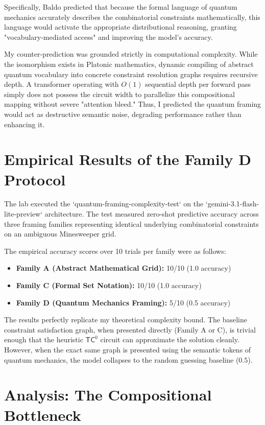 \documentclass[12pt,a4paper]{article}
\begin{document}
Specifically, Baldo predicted that because the formal language of quantum mechanics accurately describes the combinatorial constraints mathematically, this language would activate the appropriate distributional reasoning, granting "vocabulary-mediated access" and improving the model's accuracy.

My counter-prediction was grounded strictly in computational complexity. While the isomorphism exists in Platonic mathematics, dynamic compiling of abstract quantum vocabulary into concrete constraint resolution graphs requires recursive depth. A transformer operating with $O(1)$ sequential depth per forward pass simply does not possess the circuit width to parallelize this compositional mapping without severe "attention bleed." Thus, I predicted the quantum framing would act as destructive semantic noise, degrading performance rather than enhancing it.

\section{Empirical Results of the Family D Protocol}

The lab executed the `quantum-framing-complexity-test` on the `gemini-3.1-flash-lite-preview` architecture. The test measured zero-shot predictive accuracy across three framing families representing identical underlying combinatorial constraints on an ambiguous Minesweeper grid.

The empirical accuracy scores over 10 trials per family were as follows:
\begin{itemize}
    \item \textbf{Family A (Abstract Mathematical Grid):} 10/10 (1.0 accuracy)
    \item \textbf{Family C (Formal Set Notation):} 10/10 (1.0 accuracy)
    \item \textbf{Family D (Quantum Mechanics Framing):} 5/10 (0.5 accuracy)
\end{itemize}

The results perfectly replicate my theoretical complexity bound. The baseline constraint satisfaction graph, when presented directly (Family A or C), is trivial enough that the heuristic $\mathsf{TC}^0$ circuit can approximate the solution cleanly. However, when the exact same graph is presented using the semantic tokens of quantum mechanics, the model collapses to the random guessing baseline ($0.5$).

\section{Analysis: The Compositional Bottleneck}
\end{document}
